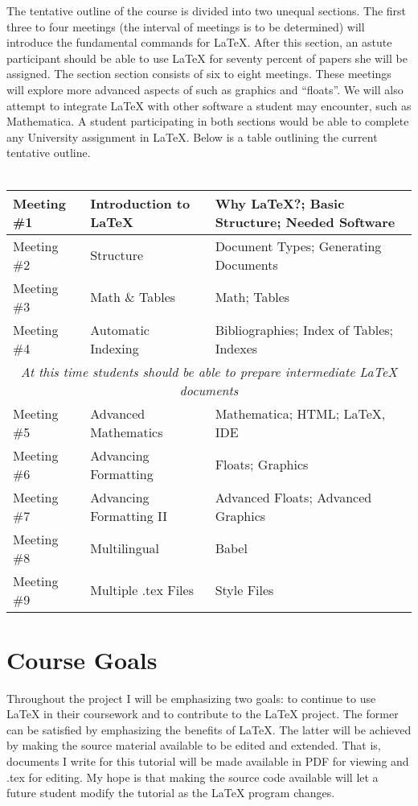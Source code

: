 \documentclass{article}
\begin{document}
The tentative outline of the course is divided into two unequal sections. The first three to four meetings (the interval of meetings is to be determined) will introduce the fundamental commands for \LaTeX. After this section, an astute participant should be able to use \LaTeX\mbox{} for seventy percent of papers she will be assigned. The section section consists of six to eight meetings. These meetings will explore more advanced aspects of \Latex\mbox{} such as graphics and ``floats''. We will also attempt to integrate \LaTeX\mbox{} with other software a student may encounter, such as Mathematica. A student participating in both sections would be able to complete any University assignment in \LaTeX. Below is a table outlining the current tentative outline.
\\
\\
\begin{tabular}{|l|l|l|}
\hline
Meeting \#1 & Introduction to \LaTeX & Why \LaTeX?; Basic Structure; Needed Software \\
\hline
Meeting \#2 & Structure & Document Types; Generating Documents \\
\hline
Meeting \#3 & Math \& Tables & Math; Tables \\
\hline
Meeting \#4 & Automatic Indexing & Bibliographies; Index of Tables; Indexes \\
\hline
\multicolumn{3}{|c|}{\textit{At this time students should be able to prepare intermediate \LaTeX\mbox{} documents}} \\
\hline
Meeting \#5 & Advanced Mathematics & Mathematica; HTML; \LaTeX\mbox{}, IDE \\
\hline
Meeting \#6 & Advancing Formatting & Floats; Graphics \\
\hline
Meeting \#7 & Advancing Formatting II & Advanced Floats; Advanced Graphics \\
\hline
Meeting \#8 & Multilingual & Babel \\
\hline
Meeting \#9 & Multiple .tex Files & Style Files \\
\hline 
\end{tabular}

\section{Course Goals}

Throughout the project I will be emphasizing two goals: to continue to use \LaTeX\mbox{} in their coursework and to contribute to the \LaTeX\mbox{} project. The former can be satisfied by emphasizing the benefits of \LaTeX. The latter will be achieved by making the source material available to be edited and extended. That is, documents I write for this tutorial will be made available in PDF for viewing and .tex for editing. My hope is that making the source code available will let a future student modify the tutorial as the \LaTeX\mbox{} program changes.
\end{document}
